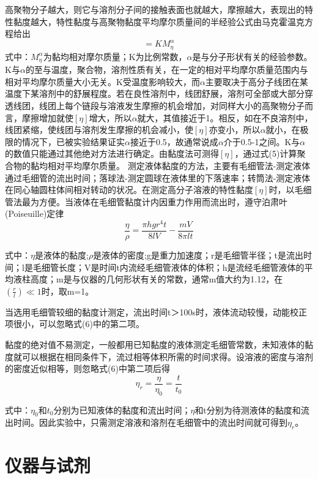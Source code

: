 \documentclass[12pt,hyperref,a4paper,UTF8]{ctexart}
\begin{document}
高聚物分子越大，则它与溶剂分子间的接触表面也就越大，摩擦越大，表现出的特性黏度越大，特性黏度与高聚物黏度平均摩尔质量间的半经验公式由马克霍温克方程给出
\begin{equation}
    [\eta] = K M^{\alpha}_\eta
\end{equation}
式中：$M^{\alpha}_\eta$为黏均相对摩尔质量；K为比例常数，$\alpha$是与分子形状有关的经验参数。K与$\alpha$的至与温度，聚合物，溶剂性质有关，在一定的相对平均摩尔质量范围内与相对平均摩尔质量大小无关。K受温度影响较大，而$\alpha$主要取决于高分子线团在某温度下某溶剂中的舒展程度。若在良性溶剂中，线团舒展，溶剂可全部或大部分穿透线团，线团上每个链段与溶液发生摩擦的机会增加，对同样大小的高聚物分子而言，摩擦增加就使$[\eta]$增大，所以$\alpha$就大，其值接近于1。相反，如在不良溶剂中，线团紧缩，使线团与溶剂发生摩擦的机会减小，使$[\eta]$亦变小，所以$\alpha$就小，在极限的情况下，已被实验结果证实$\alpha$接近于0.5，故通常说成$\alpha$介于0.5-1之间。K与$\alpha$的数值只能通过其他绝对方法进行确定。由黏度法可测得$[\eta]$，通过式(5)计算聚合物的黏均相对平均摩尔质量。
测定液体黏度的方法，主要有毛细管法-测定液体通过毛细管的流出时间；落球法-测定圆球在液体里的下落速率；转筒法-测定液体在同心轴圆柱体间相对转动的状况。在测定高分子溶液的特性黏度$[\eta]$时，以毛细管法最为方便。当液体在毛细管黏度计内因重力作用而流出时，遵守泊肃叶(Poiseuille)定律
\begin{equation}
    \frac{\eta}{\rho} = \frac{\pi hgr^4 t}{8lV} - \frac{mV}{8\pi lt}
\end{equation}

式中：$\eta$是液体的黏度;$\rho$是液体的密度;g是重力加速度；r是毛细管半径；t是流出时间；l是毛细管长度；V是时间t内流经毛细管液体的体积；h是流经毛细管液体的平均液柱高度；m是与仪器的几何形状有关的常数，通常m值大约为1.12，在$(\frac{r}{l}) \ll  1$时，取m=1。

当选用毛细管较细的黏度计测定，流出时间t＞100s时，液体流动较慢，动能校正项很小，可以忽略式(6)中的第二项。

黏度的绝对值不易测定，一般都用已知黏度的液体测定毛细管常数，未知液体的黏度就可以根据在相同条件下，流过相等体积所需的时间求得。设溶液的密度与溶剂的密度近似相等，则忽略式(6)中第二项后得
\begin{equation}
    \eta _r = \frac{\eta}{\eta_0} = \frac{t}{t_0}
\end{equation}

式中：$\eta _0$和$t_0$分别为已知液体的黏度和流出时间；$\eta$和t分别为待测液体的黏度和流出时间。因此实验中，只需测定溶液和溶剂在毛细管中的流出时间就可得到$\eta_r$。

\section{仪器与试剂}
\end{document}
